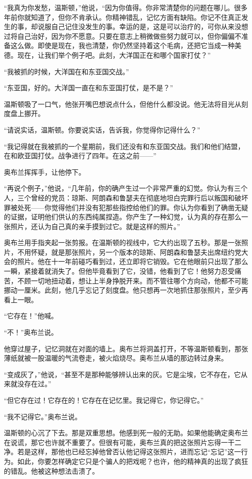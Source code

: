 ``我真为你发愁，温斯顿，''他说，``因为你值得。你非常清楚你的问题在哪儿。很多年前你就知道了，但你不肯承认。你精神错乱，记忆方面有缺陷。你记不住真正发生的事，却说服自己记住没发生的事。幸运的是，这是可以治疗的，可你从来没想过将自己治好，因为你不愿意。只要在意志上稍微做些努力就可以，但你偏偏不准备这么做。即使是现在，我也清楚，你仍然坚持着这个毛病，还把它当成一种美德。现在，让我们举个例子吧。此刻，大洋国正在和哪个国家打仗？''

``我被抓的时候，大洋国在和东亚国交战。''

``东亚国，好的。大洋国一直在和东亚国打仗，是不是？''

温斯顿吸了一口气，他张开嘴巴想说点什么，但他什么都没说。他无法将目光从刻度盘上挪开。

``请说实话，温斯顿。你要说实话，告诉我，你觉得你记得什么？''

``我记得就在我被抓的一个星期前，我们还没有和东亚国交战。我们和他们结盟，在和欧亚国打仗。战争进行了四年。在这之前------''

奥布兰挥挥手，让他停下。

``再说个例子，''他说，``几年前，你的确产生过一个非常严重的幻觉。你认为有三个人，三个曾经的党员：琼斯、阿朗森和鲁瑟夫在彻底地坦白完罪行后以叛国和破坏罪被处死------你觉得他们并没有犯那些指控给他们的罪。你认为你看到了确凿无疑的证据，证明他们供认的东西纯属捏造。你产生了一种幻觉，认为真的存在那么一张照片，还认为自己真的亲手摸到过它。就是这样的照片。''

奥布兰用手指夹起一张剪报。在温斯顿的视线中，它大约出现了五秒。那是一张照片，不用怀疑，就是那张照片，另一个版本的琼斯、阿朗森和鲁瑟夫出席纽约党大会的照片。他在十一年前碰巧看到过，还立即将它销毁。它在他眼前只出现了那么一瞬，紧接着就消失了。但他毕竟看到了它，没错，他看到了它！他努力忍受痛苦，不顾一切地扭动着，想让上半身挣脱开来。而不管往哪个方向动，他都不可能挪动一厘米。此刻，他几乎忘记了刻度盘。他只想再一次地抓住那张照片，至少再看上一眼。

``它存在！''他喊。

``不！''奥布兰说。

他穿过屋子，记忆洞就在对面的墙上。奥布兰将洞盖打开，不等温斯顿看到，那张薄纸就被一股温暖的气流卷走，被火焰烧尽。奥布兰从墙的那边转过身来。

``变成灰了，''他说，``甚至不是那种能够辨认出来的灰。它是尘埃，它不存在，它从来就没存在过。''

``但它存在过！它存在的！它存在在记忆里。我记得它，你记得它。''

``我不记得它。''奥布兰说。

温斯顿的心沉了下去。那是双重思想。他感到死一般的无助。如果他能确定奥布兰在说谎，那它也许就不重要了。但很有可能，奥布兰真的把这张照片忘得一干二净。若是这样，那他也已经忘掉他曾否认他记得这张照片，进而忘记``忘记''这一行为。如此，你要怎样确定它只是个骗人的把戏呢？也许，他的精神真的出现了疯狂的错乱。他被这种想法击溃了。


